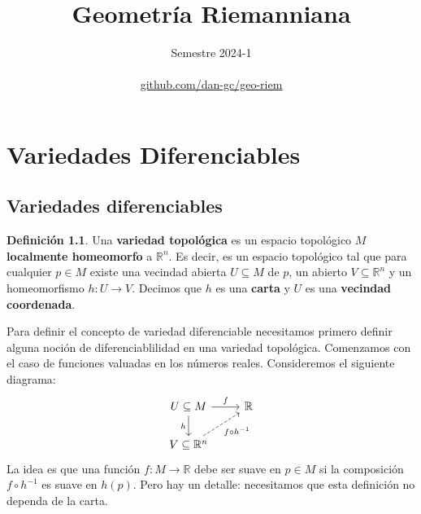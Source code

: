 \documentclass[spanish]{book}
\title{Geometría Riemanniana}
\author{Semestre 2024-1\\ \\ \href{https://github.com/dan-gc/geo-riem/blob/main/geo-riem.pdf}{github.com/dan-gc/geo-riem}}
\renewcommand{\contentsname}{Índice}
\theoremstyle{definition}
\newtheorem*{defn}{Definición}
\newcommand{\R}{\mathbb{R}}
\begin{document}
	\maketitle
	\addcontentsline{toc}{part}{\contentsname}
	\tableofcontents
	
	\chapter{Variedades Diferenciables}
	\section{Variedades diferenciables}
	\begin{defn}
		Una \textbf{variedad topológica} es un espacio topológico $M$ \textbf{localmente homeomorfo} a $\R^n$. Es decir, es un espacio topológico tal que para cualquier $p\in M$ existe una vecindad abierta $U\subseteq M$ de $p$, un abierto $V\subseteq\R^n$ y un  homeomorfismo $h:U\to V$. Decimos que $h$ es una \textbf{carta} y $U$ es una \textbf{vecindad coordenada}.
	\end{defn}
	Para definir el concepto de variedad diferenciable necesitamos primero definir alguna noción de diferenciablilidad en una variedad topológica. Comenzamos con el caso de funciones valuadas en los números reales. Consideremos el siguiente diagrama:
	\[\begin{tikzcd}
		U\subseteq M\arrow{r}{f} \arrow{d}[swap]{h} & \mathbb{R} \\
		V \subseteq \mathbb{R}^n \arrow[swap,dashed]{ur}{f \circ h^{-1}} 
	\end{tikzcd}\]
	La idea es que una función $f:M\to\R$ debe ser suave en $p\in M$ si la composición $f\circ h^{-1}$ es suave en $h(p)$. Pero hay un detalle: necesitamos que esta definición no dependa de la carta.
	
\end{document}
